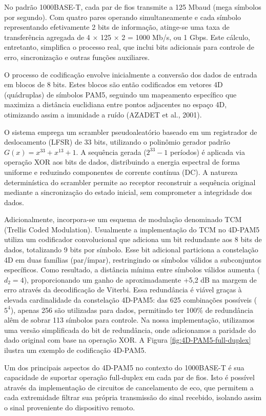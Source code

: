 \documentclass[conference]{IEEEtran}
\begin{document}
No padrão 1000BASE-T, cada par de fios transmite a 125 Mbaud (mega símbolos por segundo). Com quatro pares operando simultaneamente e cada símbolo representando efetivamente 2 bits de informação, atinge-se uma taxa de transferência agregada de 4 × 125 × 2 = 1000 Mb/s, ou 1 Gbps. Este cálculo, entretanto, simplifica o processo real, que inclui bits adicionais para controle de erro, sincronização e outras funções auxiliares.

O processo de codificação envolve inicialmente a conversão dos dados de entrada em blocos de 8 bits. Estes blocos são então codificados em vetores 4D (quádruplas) de símbolos PAM5, seguindo um mapeamento específico que maximiza a distância euclidiana entre pontos adjacentes no espaço 4D, otimizando assim a imunidade a ruído (AZADET et al., 2001). 

O sistema emprega um scrambler pseudoaleatório baseado em um registrador de deslocamento (LFSR) de 33 bits, utilizando o polinômio gerador padrão \( G(x) = x^{33} + x^{13} + 1 \). A sequência gerada (\( 2^{33} - 1 \) períodos) é aplicada via operação XOR aos bits de dados, distribuindo a energia espectral de forma uniforme e reduzindo componentes de corrente contínua (DC). A natureza determinística do scrambler permite ao receptor reconstruir a sequência original mediante a sincronização do estado inicial, sem comprometer a integridade dos dados.


Adicionalmente, incorpora-se um esquema de modulação denominado TCM (Trellis Coded Modulation). Usualmente a implementação do TCM no 4D-PAM5 utiliza um codificador convolucional que adiciona um bit redundante aos 8 bits de dados, totalizando 9 bits por símbolo. Esse bit adicional particiona a constelação 4D em duas famílias (par/ímpar), restringindo os símbolos válidos a subconjuntos específicos. Como resultado, a distância mínima entre símbolos válidos aumenta (\(d_2 = 4\)), proporcionando um ganho de aproximadamente +5,2 dB na margem de erro através da decodificação de Viterbi. Essa redundância é viável graças à elevada cardinalidade da constelação 4D-PAM5: das 625 combinações possíveis (\(5^4\)), apenas 256 são utilizadas para dados, permitindo ter 100\% de redundância alêm de sobrar 113 símbolos para controle. Na nossa implementação, utilizamos uma versão simplificada do bit de redundância, onde adicionamos a paridade do dado original com base na operação XOR. A Figura \ref{fig:4D-PAM5-full-duplex} ilustra um exemplo de codificação 4D-PAM5.

Um dos principais aspectos do 4D-PAM5 no contexto do 1000BASE-T é sua capacidade de suportar operação full-duplex em cada par de fios. Isto é possível através da implementação de circuitos de cancelamento de eco, que permitem a cada extremidade filtrar sua própria transmissão do sinal recebido, isolando assim o sinal proveniente do dispositivo remoto.
\end{document}
